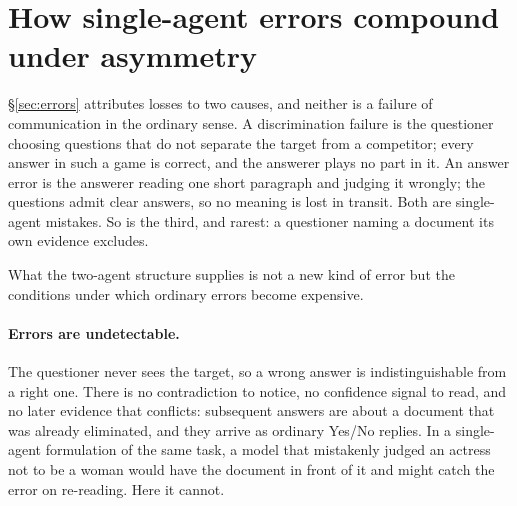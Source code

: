 \documentclass[11pt]{article}
\begin{document}
\section{How single-agent errors compound under asymmetry}
\label{sec:comm}

\S\ref{sec:errors} attributes losses to two causes, and neither is a failure of
communication in the ordinary sense. A discrimination failure is the questioner
choosing questions that do not separate the target from a competitor; every
answer in such a game is correct, and the answerer plays no part in it. An
answer error is the answerer reading one short paragraph and judging it wrongly;
the questions admit clear answers, so no meaning is lost in transit. Both are
single-agent mistakes. So is the third, and rarest: a questioner naming a
document its own evidence excludes.

What the two-agent structure supplies is not a new kind of error but the
conditions under which ordinary errors become expensive.

\paragraph{Errors are undetectable.} The questioner never sees the target, so a
wrong answer is indistinguishable from a right one. There is no contradiction to
notice, no confidence signal to read, and no later evidence that conflicts:
subsequent answers are about a document that was already eliminated, and they
arrive as ordinary Yes/No replies. In a single-agent formulation of the same
task, a model that mistakenly judged an actress not to be a woman would have the
document in front of it and might catch the error on re-reading. Here it cannot.
\end{document}
